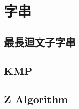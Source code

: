 %         
%         

\section{字串}
    \subsection{最長迴文子字串}
        
    \subsection{KMP}
        
    \subsection{Z Algorithm}
        
%         
%         
    

